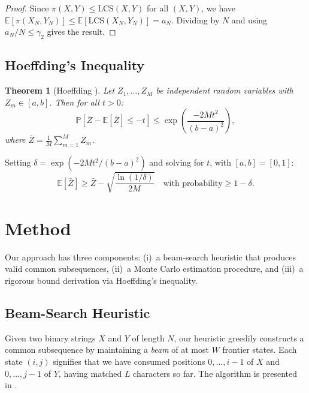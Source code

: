 \documentclass[11pt,a4paper]{article}
\newtheorem{theorem}{Theorem}
\theoremstyle{definition}
\newcommand{\E}{\mathbb{E}}
\renewcommand{\Pr}{\mathbb{P}}
\newcommand{\LCS}{\mathrm{LCS}}
\begin{document}
\begin{proof}
  Since $\pi(X, Y) \leq \LCS(X, Y)$ for all $(X, Y)$, we have
  $\E[\pi(X_N, Y_N)] \leq \E[\LCS(X_N, Y_N)] = a_N$. Dividing by $N$ and
  using $a_N / N \leq \gamma_2$ gives the result.
\end{proof}

\subsection{Hoeffding's Inequality}

\begin{theorem}[Hoeffding \citep{hoeffding1963}]
  \label{thm:hoeffding}
  Let $Z_1, \ldots, Z_M$ be independent random variables with $Z_m \in [a, b]$.
  Then for all $t > 0$:
  \begin{equation}
    \Pr\!\left[\bar{Z} - \E[\bar{Z}] \leq -t\right]
    \leq \exp\!\left(\frac{-2Mt^2}{(b - a)^2}\right),
    \label{eq:hoeffding}
  \end{equation}
  where $\bar{Z} = \frac{1}{M}\sum_{m=1}^M Z_m$.
\end{theorem}

Setting $\delta = \exp(-2Mt^2/(b-a)^2)$ and solving for $t$, with $[a,b] =
[0,1]$:
\begin{equation}
  \E[\bar{Z}] \geq \bar{Z} - \sqrt{\frac{\ln(1/\delta)}{2M}}
  \quad\text{with probability} \geq 1 - \delta.
  \label{eq:hoeffding_lb}
\end{equation}

\section{Method}
\label{sec:method}

Our approach has three components: (i)~a beam-search heuristic that produces
valid common subsequences, (ii)~a Monte Carlo estimation procedure, and
(iii)~a rigorous bound derivation via Hoeffding's inequality.

\subsection{Beam-Search Heuristic}
\label{sec:beam_search}

Given two binary strings $X$ and $Y$ of length $N$, our heuristic greedily
constructs a common subsequence by maintaining a \emph{beam} of at most $W$
frontier states. Each state $(i, j)$ signifies that we have consumed positions
$0, \ldots, i{-}1$ of $X$ and $0, \ldots, j{-}1$ of $Y$, having matched $L$
characters so far. The algorithm is presented in .
\end{document}
